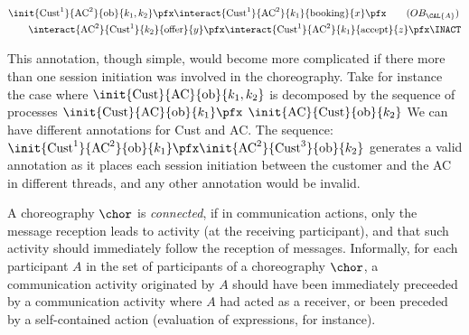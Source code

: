 \begin{align}
      & \init{\text{Cust}^1}{\text{AC}^2}{\text{ob}}{k_1,k_2} \pfx
    \interact{\text{Cust}^1}{\text{AC}^2}{k_1}{\text{booking}}{x} \pfx \tag{$OB_{\CAL{A}}$} \\
     & ~~~~~~\interact{\text{AC}^2}{\text{Cust}^1}{k_2}{\text{offer}}{y} \pfx
    \interact{\text{Cust}^1}{\text{AC}^2}{k_1}{\text{accept}}{z} \pfx
    \INACT \notag 
\end{align}

This annotation, though simple, would become more complicated if there
more than one session initiation was involved in the choreography.
 Take for instance the case where
$\init{\text{Cust}}{\text{AC}}{\text{ob}}{k_1,k_2}$ is decomposed by
the sequence of processes
$\init{\text{Cust}}{\text{AC}}{\text{ob}}{k_1}\pfx$ $
\init{\text{AC}}{\text{Cust}}{\text{ob}}{k_2}$ We can have different
annotations for Cust and AC. The sequence:
$\init{\text{Cust}^1}{\text{AC}^2}{\text{ob}}{k_1}\pfx
\init{\text{AC}^2}{\text{Cust}^3}{\text{ob}}{k_2}$ generates a valid
annotation as it places each session initiation between the customer
and the AC in different threads, and any other annotation would be
invalid.


A choreography $\chor$ is \emph{connected}, if in communication
actions, only the message reception leads to activity (at the
receiving participant), and that such activity should immediately
follow the reception of messages. 
Informally, for each participant $A$ in the set of
participants of a choreography $\chor$, a communication activity
originated by $A$ should have been immediately preceeded by a communication
activity where $A$ had acted as a receiver, or been preceded by a
self-contained action (evaluation of expressions, for instance).

